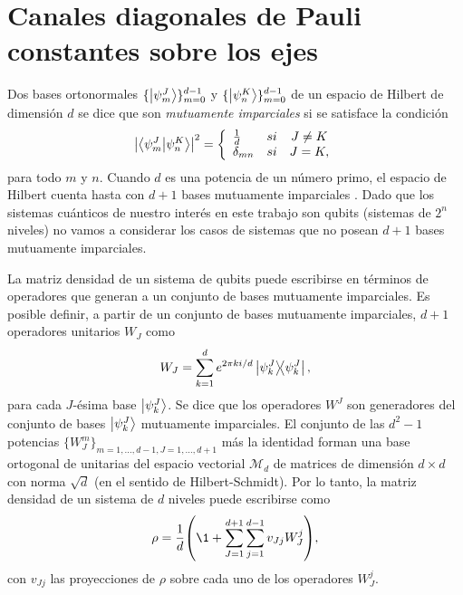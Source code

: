 \section{Canales diagonales de Pauli constantes sobre los ejes} \label{sec:ch4_ruskai} %
Dos bases ortonormales $\{\ket{\psi_m^J}\}_{m=0}^{d-1}$
y $\{\ket{\psi_n^K}\}_{m=0}^{d-1}$ de un espacio de Hilbert
de dimensión $d$ se dice que son \textit{mutuamente 
imparciales} si se satisface la 
condición~\cite{bengtsson_zyczkowski_2017,nathanson2007pauli}
\begin{align}\label{eq:mub_definition}
	\abs{\braket{\psi_m^J}{\psi_n^K}}^2=
	\left\{ \begin{array}{lcc}
             \frac{1}{d} & si & J\ne K \\
             \delta_{mn} & si & J=K,
             \end{array}
   \right.
\end{align}
para todo $m$ y $n$. Cuando $d$  es una potencia de un 
número primo, el espacio de Hilbert cuenta hasta con $d+1$ bases mutuamente
imparciales \cite{durt2010mutually}. 
Dado que los sistemas cuánticos de nuestro interés en este trabajo son qubits 
(sistemas de $2^n$ niveles) no vamos a considerar los casos de sistemas que 
no posean $d+1$ bases mutuamente imparciales. 

La matriz densidad de un sistema de qubits puede escribirse en términos 
de operadores que generan a un conjunto de bases mutuamente imparciales.
Es posible definir, a partir de un conjunto de bases mutuamente imparciales,
$d+1$ operadores unitarios $W_J$ como~\cite{nathanson2007pauli}
\begin{align}\label{eq:W_J}
	W_J=\sum_{k=1}^d e^{2\pi k i/d} \dyad{\psi_k^J}{\psi_k^J}, 
\end{align}
para cada $J$-ésima base $\ket{\psi_k^J}$. Se dice que los operadores 
$W^J$ son generadores del conjunto de bases $\ket{\psi_k^J}$ mutuamente 
imparciales. El conjunto de las $d^2-1$ potencias $\{W_J^m\}_{m=1,\ldots,d-1,
J=1,\ldots,d+1}$ más la identidad forman una base ortogonal
de unitarias del espacio vectorial $\mathcal{M}_d$ de matrices 
de dimensión $d\times d$ con norma $\sqrt{d}$
(en el sentido de Hilbert-Schmidt). Por lo tanto, la matriz densidad
de un sistema de $d$ niveles puede escribirse como
\begin{align}\label{eq:rho_mub}
\rho=\frac{1}{d}\qty(\1+\sum_{J=1}^{d+1}\sum_{j=1}^{d-1} v_{Jj}W_J^j),
\end{align}
con $v_{Jj}$ las proyecciones de $\rho$ sobre cada uno de los 
operadores $W_J^j$.

